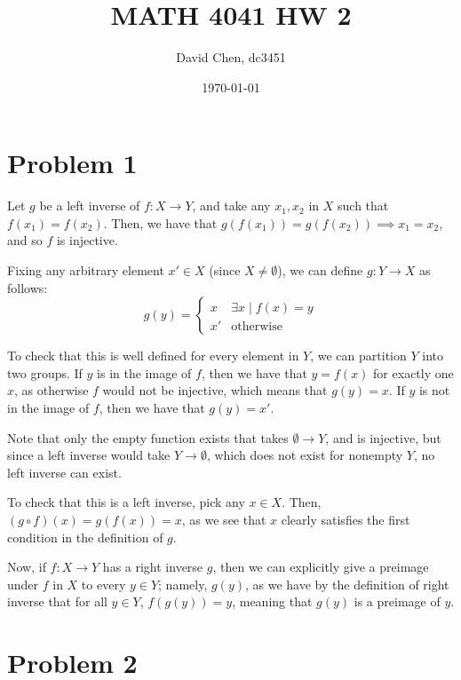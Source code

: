 \documentclass[12pt,letterpaper]{article}
\title{MATH 4041 HW 2}
\author{David Chen, dc3451}
\date{\today}
\theoremstyle{definition}
\begin{document}
\maketitle

\section*{Problem 1}

Let $g$ be a left inverse of $f: X \rightarrow Y$, and take any $x_1, x_2$ in
$X$ such that $f(x_1) = f(x_2)$. Then, we have that $g(f(x_1)) = g(f(x_2))
\implies x_1 = x_2$, and so $f$ is injective.

Fixing any arbitrary element $x' \in
X$ (since $X \neq \emptyset$), we can define $g: Y \rightarrow X$ as follows:
\[
  g(y) = \begin{cases}
    x & \exists x \mid f(x) = y \\
    x' & \text{otherwise}
  \end{cases}
\]

To check that this is well defined for every element in $Y$, we can partition
$Y$ into two groups. If $y$ is in the image of $f$, then we have that $y = f(x)$
for exactly one $x$, as otherwise $f$ would not be injective, which means that $g(y) =
x$. If $y$ is not in
the image of $f$, then we have that $g(y) = x'$.

Note that only the empty function exists that takes $\emptyset \rightarrow Y$,
and is injective, but since a left inverse would take $Y \rightarrow \emptyset$,
which does not exist for nonempty $Y$, no left inverse can exist.

To check that this is a left inverse, pick any $x \in X$. Then, $(g \circ f)(x)
= g(f(x)) = x$, as we see that $x$ clearly satisfies the first condition in the
definition of $g$.

Now, if $f: X \rightarrow Y$ has a right inverse $g$, then we can explicitly
give a preimage under $f$ in $X$ to every $y \in Y$; namely, $g(y)$, as we have
by the definition of right inverse that for all $y \in Y$, $f(g(y)) = y$,
meaning that $g(y)$ is a preimage of $y$.


\section*{Problem 2}
\end{document}
